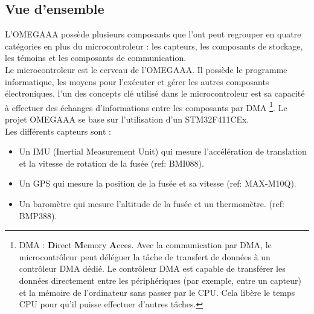 \subsection{Vue d'ensemble}

L'OMEGAAA possède plusieurs composants que l'ont peut regrouper en quatre
catégories en plus du microcontroleur : les capteurs, les composants de stockage,
les témoins et les composants de communication.\\

Le microcontroleur est le cerveau de l'OMEGAAA. Il possède le programme
informatique, les moyens pour l'exécuter et gérer les autres composants électroniques.
l'un des concepts clé utilisé dans le microcontroleur est sa capacité à effectuer des
échanges d'informations entre les composants par DMA \footnote{DMA : \textbf{D}irect
\textbf{M}emory \textbf{A}cces. Avec la communication par DMA, le microcontrôleur
peut déléguer la tâche de transfert de données à un contrôleur DMA dédié. Le contrôleur
DMA est capable de transférer les données directement entre les périphériques (par exemple,
entre un capteur) et la mémoire de l'ordinateur sans passer par le CPU. Cela libère le
temps CPU pour qu'il puisse effectuer d'autres tâches.}. Le projet OMEGAAA se base sur
l'utilisation d'un STM32F411CEx.\\

Les différents capteurs sont :
\begin{itemize}
    \item Un IMU (Inertial Measurement Unit) qui mesure l'accélération de
    translation et la vitesse de rotation de la fusée (ref: BMI088).
    \item Un GPS qui mesure la position de la fusée et sa vitesse (ref: MAX-M10Q).
    \item Un baromètre qui mesure l'altitude de la fusée et un thermomètre.
    (ref: BMP388).\\
\end{itemize}

